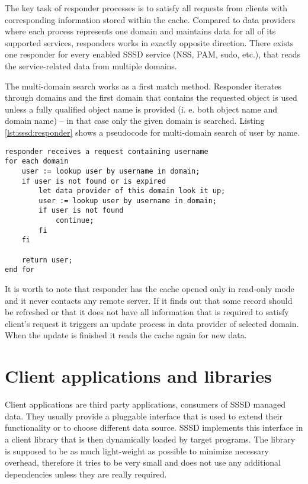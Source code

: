 The key task of responder processes is to satisfy all requests from clients with
corresponding information stored within the cache. Compared to data providers
where each process represents one domain and maintains data for all of its
supported services, responders works in exactly opposite direction. There exists
one responder for every enabled SSSD service (NSS, PAM, sudo, etc.), that reads
the service-related data from multiple domains.

The multi-domain search works as a first match method. Responder iterates
through domains and the first domain that contains the requested object is used
unless a fully qualified object name is provided (i. e. both object name and
domain name) -- in that case only the given domain is searched. Listing
\ref{lst:sssd:responder} shows a pseudocode for multi-domain search of user by
name.

\begin{lstlisting}[caption={Multi-domain lookup (get user by name)},
morekeywords={end, fi, each},label=lst:sssd:responder]
responder receives a request containing username
for each domain
    user := lookup user by username in domain;
    if user is not found or is expired
        let data provider of this domain look it up;
        user := lookup user by username in domain;
        if user is not found
            continue;
        fi
    fi

    return user;
end for
\end{lstlisting}

It is worth to note that responder has the cache opened only in read-only mode
and it never contacts any remote server. If it finds out that some record should
be refreshed or that it does not have all information that is required to
satisfy client's request it triggers an update process in data provider of
selected domain. When the update is finished it reads the cache again for new
data.

\section{Client applications and libraries}
\label{sssd:clients}

Client applications are third party applications, consumers of SSSD managed
data. They usually provide a pluggable interface that is used to extend their
functionality or to choose different data source. SSSD implements this interface
in a client library that is then dynamically loaded by target programs. The
library is supposed to be as much light-weight as possible to minimize necessary
overhead, therefore it tries to be very small and does not use any additional
dependencies unless they are really required.

